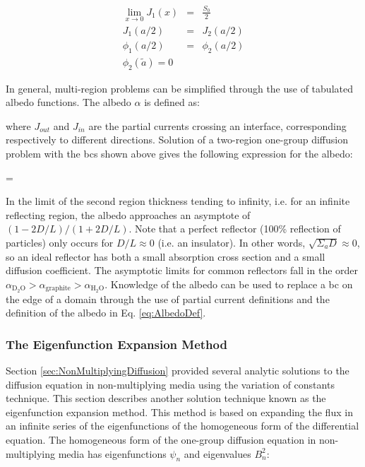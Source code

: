 \begin{subequations}
\begin{eqnarray}
\lim_{x\rightarrow0}J_1(x)&=&\frac{S_0}{2}\\
J_1(a/2)&=&J_2(a/2)\\
\phi_1(a/2)&=&\phi_2(a/2)\\
\phi_2(\tilde{a})=0
\end{eqnarray}
\end{subequations}

In general, multi-region problems can be simplified through the use of tabulated albedo functions. The albedo \(\alpha\) is defined as:

\beq
\label{eq:AlbedoDef}
\alpha\equiv{}
\eeq

where \(J_{out}\) and \(J_{in}\) are the partial currents crossing an interface, corresponding respectively to different directions. Solution of a two-region one-group diffusion problem with the \glspl{bc} shown above gives the following expression for the albedo:

\beq
\alpha=
\eeq

In the limit of the second region thickness tending to infinity, i.e. for an infinite reflecting region, the albedo approaches an asymptote of \((1-2D/L)/(1+2D/L)\). Note that a perfect reflector (100\% reflection of particles) only occurs for \(D/L\approx0\) (i.e. an insulator). In other words, \(\sqrt{\Sigma_aD}\approx0\), so an ideal reflector has both a small absorption cross section and a small diffusion coefficient. The asymptotic limits for common reflectors fall in the order \(\alpha_{\text{D$_2$O}}>\alpha_{\text{graphite}}>\alpha_{\text{H$_2$O}}\). Knowledge of the albedo can be used to replace a \gls{bc} on the edge of a domain through the use of partial current definitions and the definition of the albedo in Eq. \eqref{eq:AlbedoDef}.

\subsubsection{The Eigenfunction Expansion Method}

Section \ref{sec:NonMultiplyingDiffusion} provided several analytic solutions to the diffusion equation in non-multiplying media using the variation of constants technique. This section describes another solution technique known as the eigenfunction expansion method. This method is based on expanding the flux in an infinite series of the eigenfunctions of the homogeneous form of the differential equation. The homogeneous form of the one-group diffusion equation in non-multiplying media has eigenfunctions \(\psi_n\) and eigenvalues \(B_n^2\):

